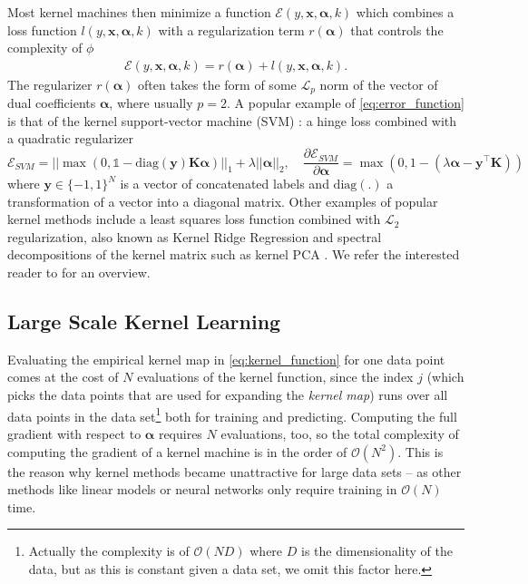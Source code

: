 \documentclass{article} %
\newcommand{\ones}{\ensuremath{\mathds{1}}}
\newcommand{\va}{\boldsymbol{\alpha}}
\newcommand{\Bx}{\mathbf{x}}
\renewcommand{\vec}[1]{\mathbf{#1}}
\begin{document}
Most kernel machines then minimize a function $\mathcal{E}(y, \Bx, \va, k)$ which combines a loss function $l(y, \Bx, \va, k)$ with a regularization term $r(\va)$ that controls the complexity of $\phi$ 
%
\begin{align}\label{eq:error_function}
\mathcal{E}(y, \Bx, \va, k) = r(\va) + l(y, \Bx, \va, k).
\end{align}
%
The regularizer $r(\va)$ often takes the form of some $\mathcal{L}_p$ norm of the vector of dual coefficients $\va$, where usually $p=2$. A popular example of \autoref{eq:error_function} is that of the kernel support-vector machine (SVM) \cite{Cortes1995}: a hinge loss combined with a quadratic regularizer
%
\begin{equation}\label{eq:svm_gradient}
\mathcal{E}_{SVM} = ||\max \left(0,\ones-\text{diag}(\vec{y}) \vec{K} \va \right)||_1 + \lambda ||\va||_2, \quad \frac{\partial\mathcal{E}_{SVM}}{\partial \va} =\max \left(0,1-\left(\lambda\va - \vec{y}^{\top}\vec{K}\right)\right)
\end{equation}
%
where $\vec{y}\in\{-1,1\}^N$ is a vector of concatenated labels and $\text{diag}(.)$ a transformation of a vector into a diagonal matrix. 
Other examples of popular kernel methods include a least squares loss function combined with $\mathcal{L}_2$ regularization, also known as Kernel Ridge Regression and spectral decompositions of the kernel matrix such as kernel PCA \cite{Scholkopf:1998p427}. We refer the interested reader to \cite{shawe2004kernel} for an overview. 

\subsection{Large Scale Kernel Learning}\label{sec:large_scale_kernel_learning}
Evaluating the empirical kernel map in \autoref{eq:kernel_function} for one data point comes at the cost of $N$ evaluations of the kernel function, since the index $j$ (which picks the data points that are used for expanding the {\em kernel map}) runs over all data points in the data set\footnote{Actually the complexity is of $\mathcal{O}(ND)$ where $D$ is the dimensionality of the data, but as this is constant given a data set, we omit this factor here.} both for training and predicting. Computing the full gradient with respect to $\va$ requires $N$ evaluations, too, so the total complexity of computing the gradient of a kernel machine is in the order of $\mathcal{O}(N^2)$. This is the reason why kernel methods became unattractive for large data sets -- as other methods like linear models or neural networks only require training in $\mathcal{O}(N)$ time. 
\end{document}
